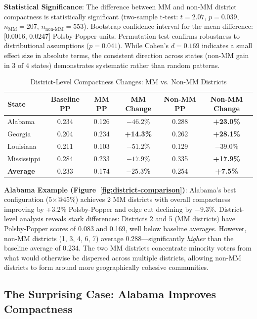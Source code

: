 \textbf{Statistical Significance}: The difference between MM and non-MM district compactness is statistically significant (two-sample t-test: $t = 2.07$, $p = 0.039$, $n_{\text{MM}} = 207$, $n_{\text{non-MM}} = 553$). Bootstrap confidence interval for the mean difference: [0.0016, 0.0247] Polsby-Popper units. Permutation test confirms robustness to distributional assumptions ($p = 0.041$). While Cohen's $d = 0.169$ indicates a small effect size in absolute terms, the consistent direction across states (non-MM gain in 3 of 4 states) demonstrates systematic rather than random patterns.

\begin{table}[htbp]
\centering
\caption{District-Level Compactness Changes: MM vs. Non-MM Districts}
\label{tab:mm-vs-nonmm-breakdown}
\begin{tabular}{lccccc}
\toprule
\textbf{State} & \textbf{Baseline PP} & \textbf{MM PP} & \textbf{MM Change} & \textbf{Non-MM PP} & \textbf{Non-MM Change} \\
\midrule
Alabama    & 0.234 & 0.126 & $-46.2$\% & 0.288 & \textbf{+23.0\%} \\
Georgia    & 0.204 & 0.234 & \textbf{+14.3\%} & 0.262 & \textbf{+28.1\%} \\
Louisiana  & 0.211 & 0.103 & $-51.2$\% & 0.129 & $-39.0$\% \\
Mississippi & 0.284 & 0.233 & $-17.9$\% & 0.335 & \textbf{+17.9\%} \\
\midrule
\textbf{Average} & 0.233 & 0.174 & \textbf{$-25.3$\%} & 0.254 & \textbf{+7.5\%} \\
\bottomrule
\end{tabular}
\end{table}

\textbf{Alabama Example (Figure~\ref{fig:district-comparison})}: Alabama's best configuration (5×@45\%) achieves 2 MM districts with overall compactness improving by +3.2\% Polsby-Popper and edge cut declining by $-9.3$\%. District-level analysis reveals stark differences: Districts 2 and 5 (MM districts) have Polsby-Popper scores of 0.083 and 0.169, well below baseline averages. However, non-MM districts (1, 3, 4, 6, 7) average 0.288---significantly \emph{higher} than the baseline average of 0.234. The two MM districts concentrate minority voters from what would otherwise be dispersed across multiple districts, allowing non-MM districts to form around more geographically cohesive communities.

\subsection{The Surprising Case: Alabama Improves Compactness}

